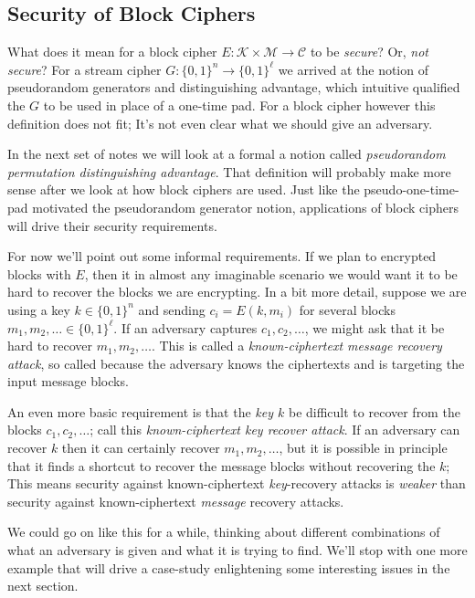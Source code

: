 \documentclass[11pt]{article}
\newcommand{\msgs}{\mathcal{M}}
\newcommand{\ctxts}{\mathcal{C}}
\newcommand{\keys}{\mathcal{K}}
\newcommand{\bits}{\{0,1\}}
\begin{document}
\subsection{Security of Block Ciphers}

What does it mean for a block cipher $E:\keys\times\msgs\to\ctxts$ to be
\emph{secure}? Or, \emph{not secure}? For a stream cipher
$G:\bits^n\to\bits^\ell$ we arrived at the notion of pseudorandom generators and
distinguishing advantage, which intuitive qualified the $G$ to be used in place
of a one-time pad. For a block cipher however this definition does not fit;
It's not even clear what we should give an adversary.

In the next set of notes we will look at a formal a notion called
\emph{pseudorandom permutation distinguishing advantage}.  That definition will
probably make more sense after we look at how block ciphers are used. Just like
the pseudo-one-time-pad motivated the pseudorandom generator notion,
applications of block ciphers will drive their security requirements.

For now we'll point out some informal requirements. If we plan to encrypted
blocks with $E$, then it in almost any imaginable scenario we would want it to
be hard to recover the blocks we are encrypting.  In a bit more detail, suppose
we are using a key $k\in\bits^n$ and sending $c_i = E(k,m_i)$ for several
blocks $m_1,m_2,\ldots\in\bits^\ell$. If an adversary captures
$c_1,c_2,\ldots$, we might ask that it be hard to recover $m_1,m_2,\ldots$.
This is called a \emph{known-ciphertext message recovery attack}, so called
because the adversary knows the ciphertexts and is targeting the input message
blocks.

An even more basic requirement is that the \emph{key $k$} be difficult to
recover from the blocks $c_1,c_2,\ldots$; call this \emph{known-ciphertext key
recover attack}. If an adversary can recover $k$ then it can certainly recover
$m_1,m_2,\ldots$, but it is possible in principle that it finds a shortcut to
recover the message blocks without recovering the $k$; This means security
against known-ciphertext \emph{key}-recovery attacks is \emph{weaker} than
security against known-ciphertext \emph{message} recovery attacks. 

We could go on like this for a while, thinking about different combinations of
what an adversary is given and what it is trying to find.  We'll stop with one
more example that will drive a case-study enlightening some interesting issues
in the next section.
\end{document}
